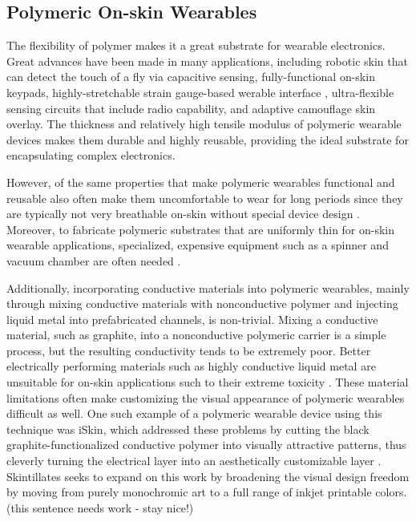 \documentclass{sigchi}
\begin{document}
\subsection{Polymeric On-skin Wearables}
The flexibility of polymer makes it a great substrate for wearable electronics. Great advances have been made in many applications, including robotic skin that can detect the touch of a fly via capacitive sensing\cite{Mannsfeld:2010is}, fully-functional on-skin keypads\cite{Anonymous:L82kTfjJ}, highly-stretchable strain gauge-based werable interface \cite{Boley:2014dr,Muth:2014bv}, ultra-flexible sensing circuits that include radio capability\cite{Jang:1gb,Anonymous:BBKIC9BZ}, and adaptive camouflage skin overlay\cite{Yu:2014ht}. The thickness and relatively high tensile modulus of polymeric wearable devices makes them durable and highly reusable, providing the ideal substrate for encapsulating complex electronics.

However, of the same properties that make polymeric wearables functional and reusable also often make them uncomfortable to wear for long periods since they are typically not very breathable on-skin without special device design \cite{Jang:1gb}. Moreover, to fabricate polymeric substrates that are uniformly thin for on-skin wearable applications, specialized, expensive equipment such as a spinner and vacuum chamber are often needed \cite{Son:2014iya,Yu:2014ht,Anonymous:BBKIC9BZ,Jang:1gb,Muth:2014bv,Anonymous:L82kTfjJ}. 

Additionally, incorporating conductive materials into polymeric wearables, mainly through mixing conductive materials with nonconductive polymer and injecting liquid metal into prefabricated channels, is non-trivial. Mixing a conductive material, such as graphite, into a nonconductive polymeric carrier is a simple process, but the resulting conductivity tends  to  be  extremely poor\cite{Weigel:2015fh}. Better electrically performing materials such as highly conductive liquid  metal  are unsuitable for on-skin applications such to their extreme toxicity \cite{Boley:2014dr}. These material limitations often make customizing the visual appearance of polymeric wearables difficult as well. One such example of a polymeric wearable device using this technique was iSkin, which addressed these problems by cutting the black graphite-functionalized conductive polymer into visually attractive patterns, thus cleverly turning the electrical layer into an aesthetically customizable layer \cite{Weigel:2015fh}. Skintillates seeks to expand on this work by broadening the visual design freedom by moving from purely monochromic art to a full range of inkjet printable colors. (this sentence needs work - stay nice!)
\end{document}
